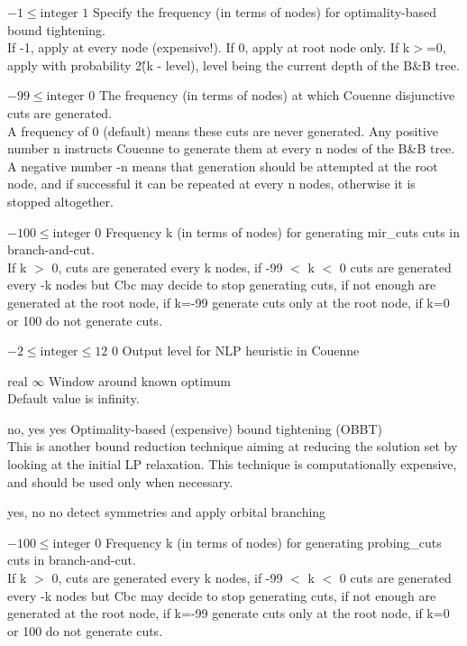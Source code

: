 %
{$-1\leq\textrm{integer}$}%
{$1$}%
{Specify the frequency (in terms of nodes) for optimality-based bound tightening.\\
If -1, apply at every node (expensive!). If 0, apply at root node only. If k$>$=0, apply with probability 2\^(k - level), level being the current depth of the B\&B tree.}%
{}

%
{$-99\leq\textrm{integer}$}%
{$0$}%
{The frequency (in terms of nodes) at which Couenne disjunctive cuts are generated.\\
A frequency of 0 (default) means these cuts are never generated. Any positive number n instructs Couenne to generate them at every n nodes of the B\&B tree. A negative number -n means that generation should be attempted at the root node, and if successful it can be repeated at every n nodes, otherwise it is stopped altogether.}%
{}

%
{$-100\leq\textrm{integer}$}%
{$0$}%
{Frequency k (in terms of nodes) for generating mir\_cuts cuts in branch-and-cut.\\
If k $>$ 0, cuts are generated every k nodes, if -99 $<$ k $<$ 0 cuts are generated every -k nodes but Cbc may decide to stop generating cuts, if not enough are generated at the root node, if k=-99 generate cuts only at the root node, if k=0 or 100 do not generate cuts.}%
{}

%
{$-2\leq\textrm{integer}\leq12$}%
{$0$}%
{Output level for NLP heuristic in Couenne}%
{}

%
{$\textrm{real}$}%
{$\infty$}%
{Window around known optimum\\
Default value is infinity.}%
{}

%
{no, yes}%
{yes}%
{Optimality-based (expensive) bound tightening (OBBT)\\
This is another bound reduction technique aiming at reducing the solution set by looking at the initial LP relaxation. This technique is computationally expensive, and should be used only when necessary.}%
{}

%
{yes, no}%
{no}%
{detect symmetries and apply orbital branching}%
{}

%
{$-100\leq\textrm{integer}$}%
{$0$}%
{Frequency k (in terms of nodes) for generating probing\_cuts cuts in branch-and-cut.\\
If k $>$ 0, cuts are generated every k nodes, if -99 $<$ k $<$ 0 cuts are generated every -k nodes but Cbc may decide to stop generating cuts, if not enough are generated at the root node, if k=-99 generate cuts only at the root node, if k=0 or 100 do not generate cuts.}%
{}

